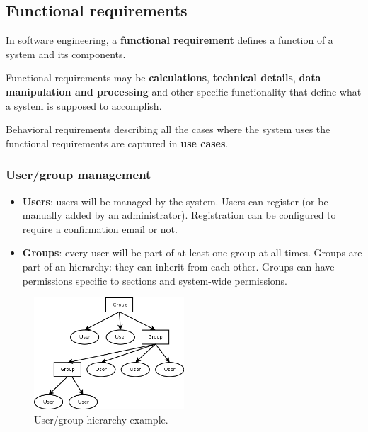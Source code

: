 \documentclass[12pt]{report}
\renewcommand\emph{\textbf}
\begin{document}
                \subsection{Functional requirements}
                    In software engineering, a \emph{functional requirement} defines a function of a system and its components.

                    Functional requirements may be \emph{calculations}, \emph{technical details}, \emph{data manipulation and processing} and other specific functionality that define what a system is supposed to accomplish.

                    Behavioral requirements describing all the cases where the system uses the functional requirements are captured in \emph{use cases}.

                    \subsubsection{User/group management}
                        \begin{itemize}
                            \item \emph{Users}: users will be managed by the system. Users can register (or be manually added by an administrator). Registration can be configured to require a confirmation email or not.
                            \item \emph{Groups}: every user will be part of at least one group at all times. Groups are part of an hierarchy: they can inherit from each other. Groups can have permissions specific to sections and system-wide permissions.
                        \end{itemize}

                        \begin{figure}[!htb]
                        \caption{User/group hierarchy example.}
                        \centering
                        \includegraphics[width=0.5\textwidth]{ed/hier_user}
                        \end{figure}
\end{document}
